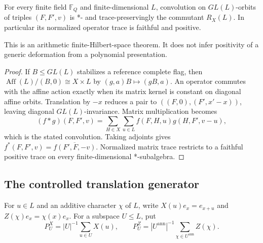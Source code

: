 \begin{theorem}
{\normalfont\statusProved}\quad
For every finite field $\mathbb F_Q$ and finite-dimensional $L$, convolution
on $GL(L)$-orbits of triples $(F,F',v)$ is *- and trace-preservingly the
commutant $R_X(L)$.  In particular its normalized operator trace is faithful
and positive.
\end{theorem}
\begin{scope}
This is an arithmetic finite-Hilbert-space theorem.  It does not infer
positivity of a generic deformation from a polynomial presentation.
\end{scope}
\begin{proof}
If $B\leq GL(L)$ stabilizes a reference complete flag, then
$\operatorname{Aff}(L)/(B,0)\cong X\times L$ by $(g,a)B\mapsto(gB,a)$.
An operator commutes with the affine action exactly when its matrix kernel is
constant on diagonal affine orbits.  Translation by $-x$ reduces a pair to
$((F,0),(F',x'-x))$, leaving diagonal $GL(L)$-invariance.  Matrix
multiplication becomes
\[
 (f*g)(F,F',v)=\sum_{H\in X}\sum_{u\in L}
                   f(F,H,u)g(H,F',v-u),
\]
which is the stated convolution.  Taking adjoints gives
$f^*(F,F',v)=\overline{f(F',F,-v)}$.  Normalized matrix trace restricts to a
faithful positive trace on every finite-dimensional *-subalgebra.
\end{proof}

\subsection{The controlled translation generator}

For $u\in L$ and an additive character $\chi$ of $L$, write
$X(u)e_x=e_{x+u}$ and $Z(\chi)e_x=\chi(x)e_x$.  For a subspace $U\leq L$,
put
\[
 P_U^X=|U|^{-1}\sum_{u\in U}X(u),\qquad
 P_U^Z=|U^{\mathrm{ann}}|^{-1}
       \sum_{\chi\in U^{\mathrm{ann}}}Z(\chi).
\]


